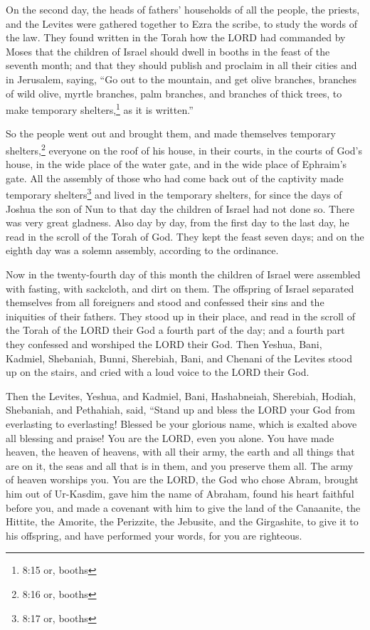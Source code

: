 \myverse{}On the second day, the heads of fathers’ households of all the
people, the priests, and the Levites were gathered together to Ezra the scribe, to study the words of
the law.
\myverse{}They found written in the Torah how the LORD had commanded by Moses that the
children of Israel should dwell in booths in the feast of the seventh month;
\myverse{}and that they should publish and proclaim in all their cities and in Jerusalem,
saying, “Go out to the mountain, and get olive branches, branches of wild olive, myrtle branches, palm
branches, and branches of thick trees, to make temporary shelters,\footnote{8:15 or, booths} as it is written.”

\myverse{}So the people went out and brought them, and made themselves
temporary shelters,\footnote{8:16 or, booths} everyone on the roof of his house, in their courts, in the courts of God’s
house, in the wide place of the water gate, and in the wide place of Ephraim’s gate.
\myverse{}All the assembly of those who had come back out of the captivity made temporary
shelters\footnote{8:17 or, booths} and lived in the temporary shelters, for since the days of Joshua the son
of Nun to that day the children of Israel had not done so. There was very great gladness.
\myverse{}Also day by day, from the first day to the last day, he read in the scroll of the Torah
of God. They kept the feast seven days; and on the eighth day was a solemn assembly, according to the
ordinance.


\mychapter{} \myverse*{}Now in the twenty-fourth day of this month the children of Israel
were assembled with fasting, with sackcloth, and dirt on them.
\myverse{}The offspring of Israel separated themselves from all foreigners and stood and
confessed their sins and the iniquities of their fathers.
\myverse{}They stood up in their place, and read in the scroll of the Torah of the LORD
their God a fourth part of the day; and a fourth part they confessed and worshiped the LORD their God.
\myverse{}Then Yeshua, Bani, Kadmiel, Shebaniah, Bunni, Sherebiah, Bani, and Chenani of
the Levites stood up on the stairs, and cried with a loud voice to the LORD their God.

\myverse{}Then the Levites, Yeshua, and Kadmiel, Bani, Hashabneiah, Sherebiah,
Hodiah, Shebaniah, and Pethahiah, said, “Stand up and bless the LORD your God from everlasting to everlasting!
Blessed be your glorious name, which is exalted above all blessing and praise!
\myverse{}You are the LORD, even you alone. You have made heaven, the heaven of heavens,
with all their army, the earth and all things that are on it, the seas and all that is in them, and you
preserve them all. The army of heaven worships you.
\myverse{}You are the LORD, the God who chose Abram, brought him out of Ur-Kasdim, gave
him the name of Abraham,
\myverse{}found his heart faithful before you, and made a covenant with him to give the
land of the Canaanite, the Hittite, the Amorite, the Perizzite, the Jebusite, and the Girgashite, to give
it to his offspring, and have performed your words, for you are righteous.

